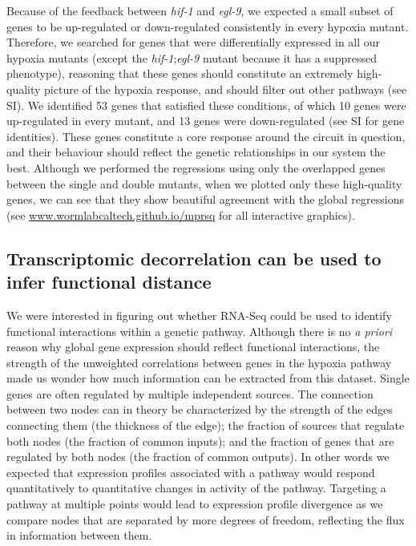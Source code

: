 \documentclass[9pt,twocolumn,twoside]{pnas-new}
\newcommand{\egl}{\emph{egl-9}}
\newcommand{\hif}{\emph{hif-1}}
\newcommand{\inall}{53}
\newcommand{\allup}{10}
\newcommand{\alldown}{13}
\begin{document}
Because of the feedback between \hif{} and \egl{}, we expected a small subset of
genes to be up-regulated or down-regulated consistently in every hypoxia mutant.
Therefore, we searched for genes that were differentially expressed in all our
hypoxia mutants (except the \hif{};\egl{} mutant because it has a suppressed
phenotype), reasoning that these genes should constitute an extremely
high-quality picture of the hypoxia response, and should filter out other
pathways (see SI).
We identified \inall{} genes that satisfied these conditions, of which \allup{}
genes were up-regulated in every mutant, and \alldown{} genes were down-regulated
(see SI for gene identities). These genes constitute a core response around the
circuit in question, and their behaviour should reflect the genetic relationships
in our system the best. Although we performed the regressions using only the
overlapped genes between the single and double mutants, when we plotted only
these high-quality genes, we can see that they show beautiful agreement with the
global regressions (see \url{www.wormlabcaltech.github.io/mprsq} for all
interactive graphics).


\subsection{Transcriptomic decorrelation can be used to infer functional distance}
\label{sub:decorrelation}

We were interested in figuring out whether RNA-Seq could be used to identify
functional interactions within a genetic pathway. Although there is no \emph{a
priori} reason why global gene expression should reflect functional interactions,
the strength of the unweighted correlations between genes in the hypoxia pathway
made us wonder how much information can be extracted from this dataset. Single
genes are often regulated by multiple independent sources. The connection between
two nodes can in theory be characterized by the strength of the edges connecting
them (the thickness of the edge); the fraction of sources that regulate both
nodes (the fraction of common inputs); and the fraction of genes that are
regulated by both nodes (the fraction of common outputs).
In other words we expected that expression profiles associated with a pathway
would respond quantitatively to quantitative changes in activity of the pathway.
Targeting a pathway at multiple points would lead to expression profile
divergence as we compare nodes that are separated by more degrees of freedom,
reflecting the flux in information between them.
\end{document}
